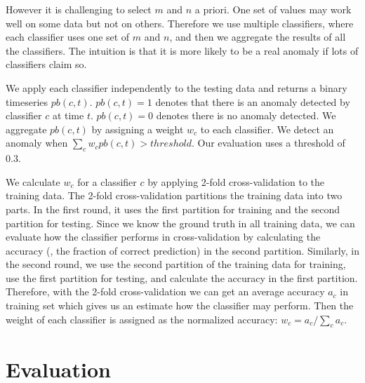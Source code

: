 However it is challenging to select $m$ and $n$ a priori. One set of
values may work well on some data but not on others. %
Therefore we use multiple classifiers, where each classifier uses
one set of $m$ and $n$, and then we aggregate the results of all the
classifiers. The intuition is that it is more likely to be a real
anomaly if lots of classifiers claim so.

We apply each classifier independently to the testing data and 
returns a binary timeseries $pb(c, t)$. $pb(c, t)=1$ denotes that there 
is an anomaly detected by classifier $c$ at time $t$. $pb(c, t)=0$ 
denotes there is no anomaly detected. We aggregate $pb(c, t)$ by assigning 
a weight $w_c$ to each classifier. We detect an anomaly when $\sum_{c} w_c pb(c, t) 
> threshold$. Our evaluation uses a threshold of 0.3.

We calculate $w_c$ for a classifier $c$ by applying 2-fold 
cross-validation to the training data.
The 2-fold cross-validation partitions the training data into two parts. In 
the first round, it uses the first partition for training and the second partition for 
testing. Since we know the ground truth in all training data, we can evaluate 
how the classifier performs in cross-validation by calculating the accuracy
(\ie, the fraction of correct prediction) in the second partition. Similarly, 
in the second round, we use the second partition of the training data for training, 
use the first partition for testing, and calculate the accuracy in the first partition.
Therefore, with the 2-fold cross-validation we can get an average accuracy $a_c$ in 
training set which gives us an estimate how the classifier may perform.
Then the weight of each classifier is assigned as the normalized 
accuracy: $w_c = a_c / \sum_{c} a_c$.



\section{Evaluation}
\label{sec:evaluate}


